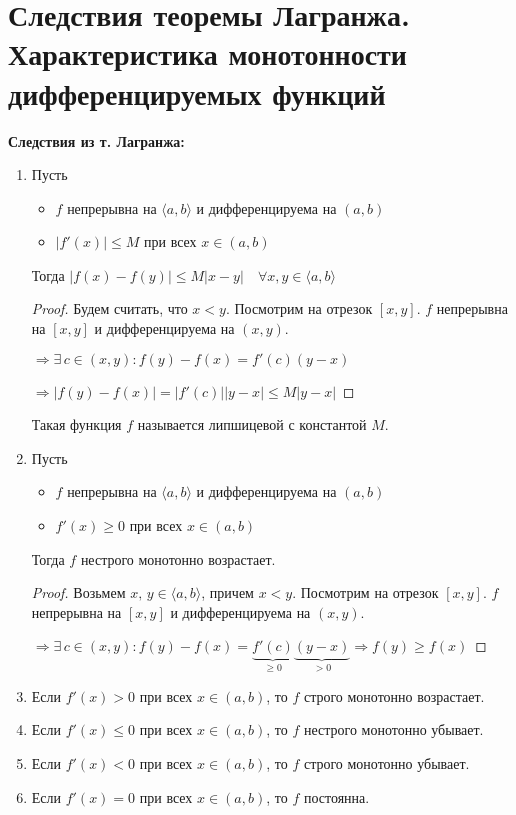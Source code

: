 \section{Следствия теоремы Лагранжа. Характеристика монотонности дифференцируемых функций \href{https://youtu.be/OXDjegAsmSU?t=6845}{\Walley}}
\textbf{Следствия из т. Лагранжа:}
\begin{enumerate}
    \item Пусть
    \begin{itemize}
        \item $f$ непрерывна на $\langle a, b \rangle$ и дифференцируема на $(a, b)$
        \item $|f'(x)| \leqslant M$ при всех $x \in (a, b)$
    \end{itemize}
    Тогда $|f(x) - f(y)| \leqslant M|x - y| \quad \forall x, y \in \langle a, b \rangle$
    \begin{proof}
        Будем считать, что $x < y$. Посмотрим на отрезок $[x, y]$. $f$ непрерывна на $[x, y]$ и дифференцируема на $(x, y)$. 

        $\Rightarrow \exists \, c \in (x, y) : f(y) - f(x) = f'(c)(y - x)$

        $\Rightarrow |f(y) - f(x)| = |f'(c)||y - x| \leqslant M|y - x|$
    \end{proof}
    \begin{notice}
        Такая функция $f$ называется липшицевой с константой $M$.
    \end{notice}
    \item Пусть
    \begin{itemize}
        \item $f$ непрерывна на $\langle a, b \rangle$ и дифференцируема на $(a, b)$
        \item $f'(x) \geqslant 0$ при всех $x \in (a, b)$
    \end{itemize}
    Тогда $f$ нестрого монотонно возрастает.
    \begin{proof}
        Возьмем $x, \, y \in \langle a, b \rangle$, причем $x < y$. 
        Посмотрим на отрезок $[x, y]$. $f$ непрерывна на $[x, y]$ и дифференцируема на $(x, y)$. 

        $\Rightarrow \exists \, c \in (x, y) : f(y) - f(x) = \underbrace{f'(c)}_{\geqslant 0}\underbrace{(y - x)}_{> 0} \Rightarrow f(y) \geqslant f(x)$
    \end{proof}
    \item Если $f'(x) > 0$ при всех $x \in (a, b)$, то $f$ строго монотонно возрастает.
    \item Если $f'(x) \leqslant 0$ при всех $x \in (a, b)$, то $f$ нестрого монотонно убывает.
    \item Если $f'(x) < 0$ при всех $x \in (a, b)$, то $f$ строго монотонно убывает.
    \item Если $f'(x) = 0$ при всех $x \in (a, b)$, то $f$ постоянна.
\end{enumerate}

